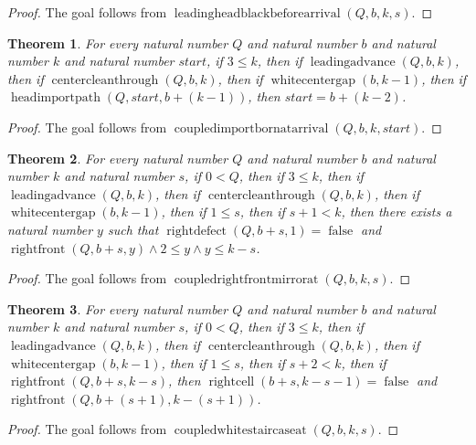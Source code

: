 \documentclass[11pt]{article}
\newtheorem{theorem}{Theorem}[section]
\theoremstyle{definition}
\begin{document}
\begin{proof}
The goal follows from \(\operatorname{leadingheadblackbeforearrival}(Q, b, k, s)\).
\end{proof}
\begin{theorem}
\label{ll:observations:coupled-import-born-at-arrival}
For every natural number \(Q\) and natural number \(b\) and natural number \(k\) and natural number \(start\), if \(3 \le k\), then if \(\operatorname{leadingadvance}(Q, b, k)\), then if \(\operatorname{centercleanthrough}(Q, b, k)\), then if \(\operatorname{whitecentergap}(b, k - 1)\), then if \(\operatorname{headimportpath}(Q, start, b + (k - 1))\), then \(start = b + (k - 2)\).
\end{theorem}
\begin{proof}
The goal follows from \(\operatorname{coupledimportbornatarrival}(Q, b, k, start)\).
\end{proof}
\begin{theorem}
\label{ll:observations:coupled-right-front-mirror-at}
For every natural number \(Q\) and natural number \(b\) and natural number \(k\) and natural number \(s\), if \(0 < Q\), then if \(3 \le k\), then if \(\operatorname{leadingadvance}(Q, b, k)\), then if \(\operatorname{centercleanthrough}(Q, b, k)\), then if \(\operatorname{whitecentergap}(b, k - 1)\), then if \(1 \le s\), then if \(s + 1 < k\), then there exists a natural number \(y\) such that \(\operatorname{rightdefect}(Q, b + s, 1) = \operatorname{false}\) and \(\operatorname{rightfront}(Q, b + s, y) \land 2 \le y \land y \le k - s\).
\end{theorem}
\begin{proof}
The goal follows from \(\operatorname{coupledrightfrontmirrorat}(Q, b, k, s)\).
\end{proof}
\begin{theorem}
\label{ll:observations:coupled-white-staircase-at}
For every natural number \(Q\) and natural number \(b\) and natural number \(k\) and natural number \(s\), if \(0 < Q\), then if \(3 \le k\), then if \(\operatorname{leadingadvance}(Q, b, k)\), then if \(\operatorname{centercleanthrough}(Q, b, k)\), then if \(\operatorname{whitecentergap}(b, k - 1)\), then if \(1 \le s\), then if \(s + 2 < k\), then if \(\operatorname{rightfront}(Q, b + s, k - s)\), then \(\operatorname{rightcell}(b + s, k - s - 1) = \operatorname{false}\) and \(\operatorname{rightfront}(Q, b + (s + 1), k - (s + 1))\).
\end{theorem}
\begin{proof}
The goal follows from \(\operatorname{coupledwhitestaircaseat}(Q, b, k, s)\).
\end{proof}
\end{document}
